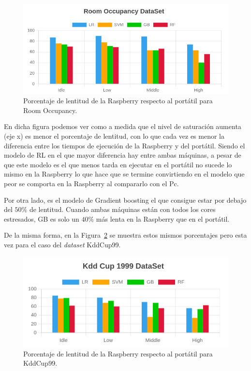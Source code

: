 \documentclass[a4paper, 12pt]{book}
\begin{document}
\begin{figure}[]
  \centering
  \includegraphics[width=15cm, keepaspectratio]{img/per_occupancy.png}
  \caption{Porcentaje de lentitud de la Raspberry respecto al portátil para Room Occupancy.}
  \label{fig:per_occupancy}
\end{figure}

En dicha figura podemos ver como a medida que el nivel de saturación aumenta (eje x) es menor el porcentaje de lentitud, con lo que cada vez es menor la diferencia entre los tiempos de ejecución de la Raspberry y del portátil. Siendo el modelo de RL en el que mayor diferencia hay entre ambas máquinas, a pesar de que este modelo es el que menos tarda en ejecutar en el portátil no sucede lo mismo en la Raspberry lo que hace que se termine convirtiendo en el modelo que peor se comporta en la Raspberry al compararlo con el Pc.

Por otra lado, es el modelo de Gradient boosting el que consigue estar por debajo del $50\%$ de lentitud. Cuando ambas máquinas están con todos los cores estresados, GB es solo un $40\%$ más lenta en la Raspberry que en el portátil.

De la misma forma, en la Figura~\ref{fig:per_kdd} se muestra estos mismos porcentajes pero esta vez para el caso del \textit{dataset} KddCup99.

\begin{figure}[]
  \centering
  \includegraphics[width=14cm, keepaspectratio]{img/per_kdd.png}
  \caption{Porcentaje de lentitud de la Raspberry respecto al portátil para KddCup99.}
  \label{fig:per_kdd}
\end{figure}
\end{document}
